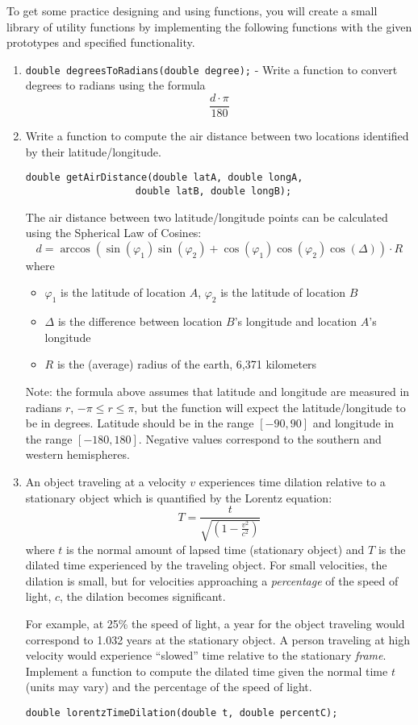 \documentclass[12pt]{scrartcl}
\begin{document}
To get some practice designing and using functions, you will 
create a small library of utility functions by implementing
the following functions with the given prototypes and specified 
functionality.
\begin{enumerate}
  \item \texttt{double degreesToRadians(double degree);} - Write a 
  	function to convert degrees to radians using the formula 
		$$\frac{d\cdot \pi}{180}$$
  \item Write a function to compute the air distance between two locations 
    identified by their latitude/longitude.  
\begin{verbatim}
double getAirDistance(double latA, double longA, 
                   double latB, double longB);
\end{verbatim}  
The air distance between two latitude/longitude points can be calculated 
using the Spherical Law of Cosines:
 $$d = \arccos{(\sin(\varphi_1) \sin(\varphi_2) + \cos(\varphi_1) \cos(\varphi_2) \cos(\Delta) )} \cdot R$$
where
\begin{itemize}
  \item $\varphi_1$ is the latitude of location $A$, $\varphi_2$ is the latitude of location $B$
  \item $\Delta$ is the difference between location $B$'s longitude and location $A$'s longitude
  \item $R$ is the (average) radius of the earth, 6,371 kilometers
\end{itemize}
Note: the formula above assumes that latitude and longitude are measured 
in radians $r$, $-\pi \leq r \leq \pi$, but the function will expect 
the latitude/longitude to be in degrees.  Latitude should be in the range 
$[-90, 90]$ and longitude in the range $[-180, 180]$.  Negative values 
correspond to the southern and western hemispheres.

  \item An object traveling at a velocity $v$ experiences time dilation
  relative to a stationary object which is quantified by the Lorentz equation:
  $$T = \frac{t}{\sqrt{(1-\frac{v^2}{c^2})}}$$
  where $t$ is the normal amount of lapsed time (stationary object) 
  and $T$ is the dilated time experienced by the traveling object.  
  For small velocities, the dilation is small, but for velocities
  approaching a \emph{percentage} of the speed of light, $c$, the 
  dilation becomes significant.
  
  For example, at 25\% the speed of light, a year for the object 
  traveling would correspond to 1.032 years at the stationary object. 
  A person traveling at high velocity would experience ``slowed'' time
  relative to the stationary \emph{frame}.  Implement a function to 
  compute the dilated time given the normal time $t$ (units may vary)
  and the percentage of the speed of light.
\begin{verbatim}
double lorentzTimeDilation(double t, double percentC);
\end{verbatim}

\end{enumerate}  
\end{document}

